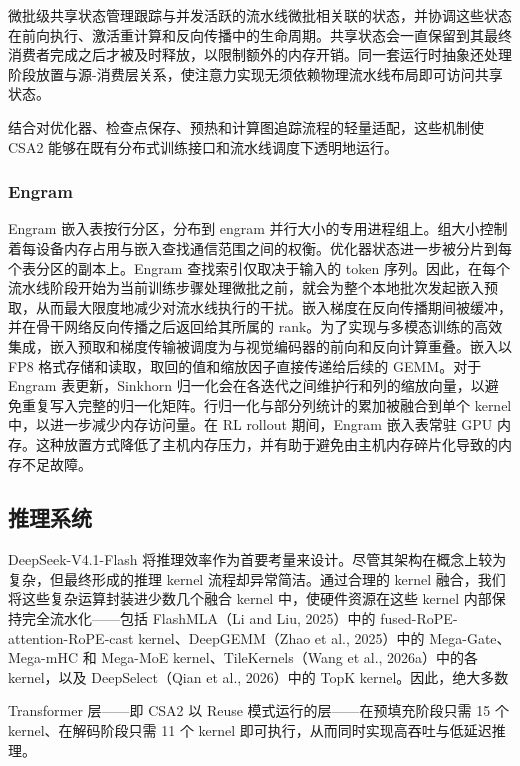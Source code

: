 \documentclass[
  10
]{article}
\begin{document}
微批级共享状态管理跟踪与并发活跃的流水线微批相关联的状态，并协调这些状态在前向执行、激活重计算和反向传播中的生命周期。共享状态会一直保留到其最终消费者完成之后才被及时释放，以限制额外的内存开销。同一套运行时抽象还处理阶段放置与源-消费层关系，使注意力实现无须依赖物理流水线布局即可访问共享状态。

结合对优化器、检查点保存、预热和计算图追踪流程的轻量适配，这些机制使 CSA2 能够在既有分布式训练接口和流水线调度下透明地运行。

\subsubsection{Engram}\label{engram-1}

Engram 嵌入表按行分区，分布到 engram 并行大小的专用进程组上。组大小控制着每设备内存占用与嵌入查找通信范围之间的权衡。优化器状态进一步被分片到每个表分区的副本上。Engram 查找索引仅取决于输入的 token 序列。因此，在每个流水线阶段开始为当前训练步骤处理微批之前，就会为整个本地批次发起嵌入预取，从而最大限度地减少对流水线执行的干扰。嵌入梯度在反向传播期间被缓冲，并在骨干网络反向传播之后返回给其所属的 rank。为了实现与多模态训练的高效集成，嵌入预取和梯度传输被调度为与视觉编码器的前向和反向计算重叠。嵌入以 FP8 格式存储和读取，取回的值和缩放因子直接传递给后续的 GEMM。对于 Engram 表更新，Sinkhorn 归一化会在各迭代之间维护行和列的缩放向量，以避免重复写入完整的归一化矩阵。行归一化与部分列统计的累加被融合到单个 kernel 中，以进一步减少内存访问量。在 RL rollout 期间，Engram 嵌入表常驻 GPU 内存。这种放置方式降低了主机内存压力，并有助于避免由主机内存碎片化导致的内存不足故障。

\subsection{推理系统}\label{inference-system}

DeepSeek-V4.1-Flash 将推理效率作为首要考量来设计。尽管其架构在概念上较为复杂，但最终形成的推理 kernel 流程却异常简洁。通过合理的 kernel 融合，我们将这些复杂运算封装进少数几个融合 kernel 中，使硬件资源在这些 kernel 内部保持完全流水化——包括 FlashMLA（Li and Liu, 2025）中的 fused-RoPE-attention-RoPE-cast kernel、DeepGEMM（Zhao et al., 2025）中的 Mega-Gate、Mega-mHC 和 Mega-MoE kernel、TileKernels（Wang et al., 2026a）中的各 kernel，以及 DeepSelect（Qian et al., 2026）中的 TopK kernel。因此，绝大多数



Transformer 层——即 CSA2 以 Reuse 模式运行的层——在预填充阶段只需 15 个 kernel、在解码阶段只需 11 个 kernel 即可执行，从而同时实现高吞吐与低延迟推理。
\end{document}

